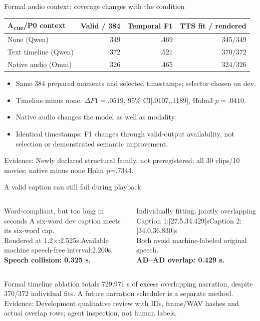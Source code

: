 \documentclass[aspectratio=169,11pt]{beamer}
\newcommand{\Acue}{A\textsubscript{cue}}
\newcommand{\source}[1]{\vfill{\tiny\color{gray}Evidence: #1}}
\begin{document}
\begin{frame}{Formal audio context: coverage changes with the condition}
\centering
\begin{tabular}{lrrr}
\toprule \Acue{}/P0 context & Valid / 384 & Temporal F1 & TTS fit / rendered \\
\midrule None (Qwen) & 349 & .469 & 345/349 \\
Text timeline (Qwen) & 372 & .521 & 370/372 \\
Native audio (Omni) & 326 & .465 & 324/326 \\
\bottomrule
\end{tabular}
\vspace{5mm}
\begin{itemize}
\item Same 384 prepared moments and selected timestamps; selector chosen on dev.
\item Timeline minus none: $\Delta F1=.0519$, 95\% CI[.0107,.1189], Holm3 $p=.0410$.
\item Native audio changes the model as well as modality.
\item Identical timestamps: F1 changes through valid-output availability, not selection or demonstrated semantic improvement.
\end{itemize}
\source{Newly declared structural family, not preregistered; all 30 clips/10 movies; native minus none Holm p=.7344.}
\end{frame}

\begin{frame}{A valid caption can still fail during playback}
\begin{columns}[T]
\begin{block}{Word-compliant, but too long in seconds}
A six-word dev caption meets its six-word cap.\\[2mm]
Rendered at 1.2$\times$:2.525s.\newline Available machine speech-free interval:2.200s.\\[2mm]
\textbf{Speech collision: 0.325 s.}
\end{block}
\begin{block}{Individually fitting, jointly overlapping}
Caption 1:[27.5,34.429]s\newline Caption 2:[34.0,36.830]s\\[2mm]
Both avoid machine-labeled original speech.\\[2mm]
\textbf{AD--AD overlap: 0.429 s.}
\end{block}
\end{columns}
\small Formal timeline ablation totals 729.971 s of excess overlapping narration, despite 370/372 individual fits. A future narration scheduler is a separate method.
\source{Development qualitative review with IDs, frame/WAV hashes and actual overlap rows; agent inspection, not human labels.}
\end{frame}
\end{document}

